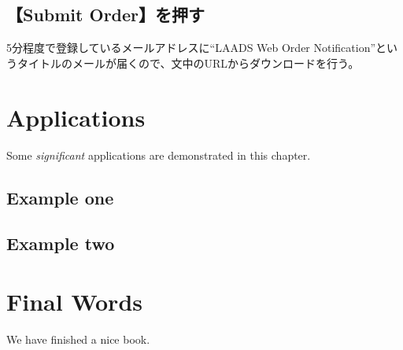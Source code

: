 \documentclass[
]{book}
\begin{document}
\hypertarget{submit-orderux3092ux62bcux3059}{%
\section{【Submit Order】を押す}\label{submit-orderux3092ux62bcux3059}}

5分程度で登録しているメールアドレスに``LAADS Web Order Notification''というタイトルのメールが届くので、文中のURLからダウンロードを行う。

\hypertarget{applications}{%
\chapter{Applications}\label{applications}}

Some \emph{significant} applications are demonstrated in this chapter.

\hypertarget{example-one}{%
\section{Example one}\label{example-one}}

\hypertarget{example-two}{%
\section{Example two}\label{example-two}}

\hypertarget{final-words}{%
\chapter{Final Words}\label{final-words}}

We have finished a nice book.

  
\end{document}
